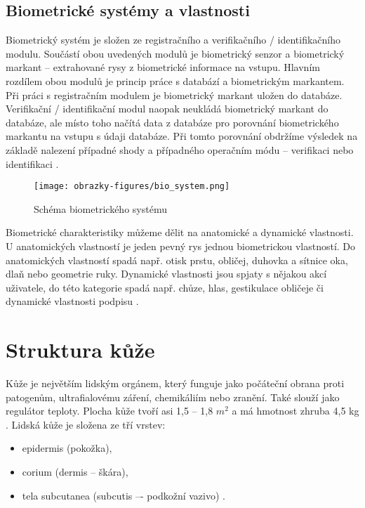 \subsection*{Biometrické systémy a vlastnosti}
Biometrický systém je složen ze registračního a verifikačního / identifikačního modulu. Součástí obou uvedených modulů je biometrický senzor a biometrický markant -- extrahované rysy z biometrické informace na vstupu. Hlavním rozdílem obou modulů je princip práce s databází a biometrickým markantem.  Při práci s registračním modulem je biometrický markant uložen do databáze. Verifikační / identifikační modul naopak neukládá biometrický markant do databáze, ale místo toho načítá data z databáze pro porovnání biometrického markantu na vstupu s údaji databáze. Při tomto porovnání obdržíme výsledek na základě nalezení případné shody a případného operačním módu -- verifikaci nebo identifikaci \cite{BIOopora}.

\begin{figure}[!htbp]
    \centering
    \texttt{[image: obrazky-figures/bio\_system.png]}
    \caption{Schéma biometrického systému \cite{BIOopora}}
\end{figure}

Biometrické charakteristiky můžeme dělit na anatomické a dynamické vlastnosti. U anatomických vlastností je jeden pevný rys jednou biometrickou vlastností. Do anatomických vlastností spadá např. otisk prstu, obličej, duhovka a sítnice oka, dlaň nebo geometrie ruky. Dynamické vlastnosti jsou spjaty s nějakou akcí uživatele, do této kategorie spadá např. chůze, hlas, gestikulace obličeje či dynamické vlastnosti podpisu \cite{BIOopora}. 
\section{Struktura kůže}
Kůže je největším lidským orgánem, který funguje jako počáteční obrana proti patogenům, ultrafialovému záření, chemikáliím nebo zranění. Také slouží jako regulátor teploty. Plocha kůže tvoří asi 1,5 -- 1,8 $m^2$ a má hmotnost zhruba 4,5 kg \cite{ZakladyFunkcniAnatomieCloveka}. 
Lidská kůže je složena ze tří vrstev:
\begin{itemize}
    \item epidermis (pokožka),
    \item corium (dermis -- škára),
    \item tela subcutanea (subcutis –- podkožní vazivo)  \cite{ZakladyFunkcniAnatomieCloveka}.
\end{itemize}

